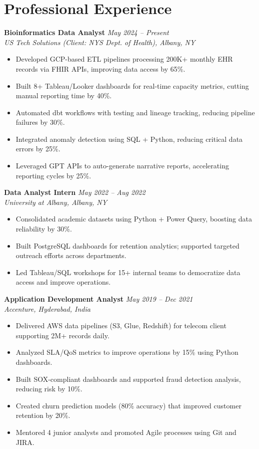 \documentclass[11pt,a4paper]{article}
\newcommand{\dateright}[1]{\hfill{\small\textit{#1}}}
\newcommand{\sectionneed}{\Needspace{3\baselineskip}}
\begin{document}
\sectionneed
\section*{Professional Experience}

\noindent\textbf{Bioinformatics Data Analyst} \dateright{May 2024 – Present}\\
\textit{US Tech Solutions (Client: NYS Dept. of Health), Albany, NY}
\begin{itemize}
    \item Developed GCP-based ETL pipelines processing 200K+ monthly EHR records via FHIR APIs, improving data access by 65\%.
    \item Built 8+ Tableau/Looker dashboards for real-time capacity metrics, cutting manual reporting time by 40\%.
    \item Automated dbt workflows with testing and lineage tracking, reducing pipeline failures by 30\%.
    \item Integrated anomaly detection using SQL + Python, reducing critical data errors by 25\%.
    \item Leveraged GPT APIs to auto-generate narrative reports, accelerating reporting cycles by 25\%.
\end{itemize}

\vspace{2pt}
\noindent\textbf{Data Analyst Intern} \dateright{May 2022 – Aug 2022}\\
\textit{University at Albany, Albany, NY}
\begin{itemize}
    \item Consolidated academic datasets using Python + Power Query, boosting data reliability by 30\%.
    \item Built PostgreSQL dashboards for retention analytics; supported targeted outreach efforts across departments.
    \item Led Tableau/SQL workshops for 15+ internal teams to democratize data access and improve operations.
\end{itemize}

\vspace{2pt}
\noindent\textbf{Application Development Analyst} \dateright{May 2019 – Dec 2021}\\
\textit{Accenture, Hyderabad, India}
\begin{itemize}
    \item Delivered AWS data pipelines (S3, Glue, Redshift) for telecom client supporting 2M+ records daily.
    \item Analyzed SLA/QoS metrics to improve operations by 15\% using Python dashboards.
    \item Built SOX-compliant dashboards and supported fraud detection analysis, reducing risk by 10\%.
    \item Created churn prediction models (80\% accuracy) that improved customer retention by 20\%.
    \item Mentored 4 junior analysts and promoted Agile processes using Git and JIRA.
\end{itemize}
\end{document}
